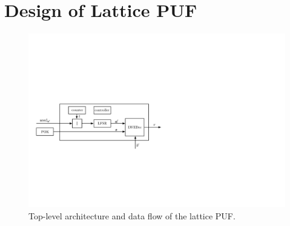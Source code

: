 \section{Design of Lattice PUF}
\label{sec:design}
\begin{figure}[t!]
    \centering
    \includegraphics[width = 1.0\linewidth]{./figs/top_level_arch_new.pdf}    \caption{Top-level architecture and data flow of the lattice PUF.}
    \label{fig:fpga_impl}
\end{figure}

